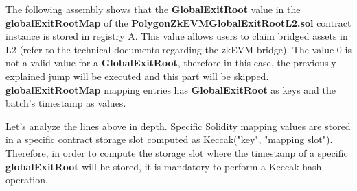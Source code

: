 
The following assembly shows that the \textbf{GlobalExitRoot} value in the \textbf{globalExitRootMap} of the \textbf{PolygonZkEVMGlobalExitRootL2.sol} contract instance is stored in registry A. This value allows users to claim bridged assets in L2 (refer to the technical documents regarding the zkEVM bridge). The value 0 is not a valid value for a \textbf{GlobalExitRoot}, therefore in this case, the previously explained jump will be executed and this part will be skipped. \textbf{globalExitRootMap} mapping entries has \textbf{GlobalExitRoot} as keys and the batch's timestamp as values.


Let's analyze the lines above in depth. Specific Solidity mapping values are stored in a specific contract storage slot computed as Keccak("key", "mapping slot"). Therefore, in order to compute the storage slot where the timestamp of a specific \textbf{globalExitRoot} will be stored, it is mandatory to perform a Keccak hash operation.

